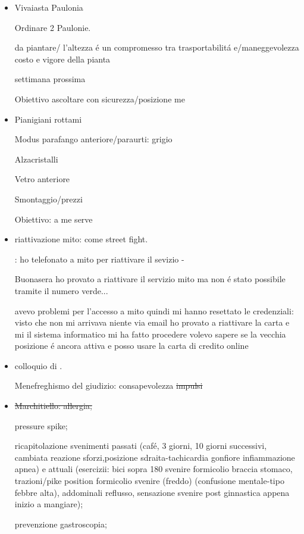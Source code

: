 \begin{itemize}

\item Vivaiasta Paulonia

Ordinare 2 Paulonie.

da piantare/ l'altezza \'e un compromesso tra trasportabilit\'a e/maneggevolezza costo e vigore della pianta

settimana prossima

Obiettivo ascoltare con sicurezza/posizione me

\item Pianigiani rottami

Modus parafango anteriore/paraurti: grigio

Alzacristalli

Vetro anteriore

Smontaggio/prezzi

Obiettivo: a me serve

\item riattivazione mito: come street fight.

: ho telefonato a mito per riattivare il sevizio - \keyword{}

Buonasera ho provato a riattivare il servizio mito ma non \'e stato possibile tramite il numero verde...

avevo problemi per l'accesso a mito quindi mi hanno resettato le credenziali: visto che non mi arrivava niente via email ho provato a riattivare la carta e mi il sistema informatico mi ha fatto procedere volevo sapere se la vecchia posizione \'e ancora attiva e posso usare la carta di credito online

\item colloquio di .

Menefreghismo del giudizio: consapevolezza \sout{impulsi}

\item \sout{Marchitiello: allergia;}

pressure spike;

ricapitolazione svenimenti passati (caf\'e, 3 giorni, 10 giorni successivi, cambiata reazione sforzi,posizione sdraita-tachicardia gonfiore infiammazione apnea) e attuali (esercizii: bici sopra 180 svenire formicolio braccia stomaco, trazioni/pike position formicolio svenire (freddo) (confusione mentale-tipo febbre alta), addominali reflusso, sensazione svenire post ginnastica appena inizio a mangiare);

prevenzione gastroscopia;


\end{itemize}
